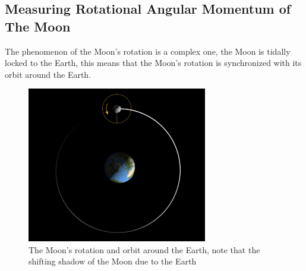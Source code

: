 \documentclass[12pt,oneside,a4paper,english]{article}
\begin{document}
\subsection{Measuring Rotational Angular Momentum of The Moon}
The phenomenon of the Moon's rotation is a complex one, the Moon is tidally locked to the Earth, this means that the Moon's rotation is synchronized with its orbit around the Earth. 
\begin{figure}[H]
    \centering
    \includegraphics[width=0.7\textwidth]{MoonLocked.png}
    \caption{The Moon's rotation and orbit around the Earth, note that the shifting shadow of the Moon due to the Earth\cite{moonlock}}
    \label{fig:moon_rotation}
\end{figure}
\end{document}
